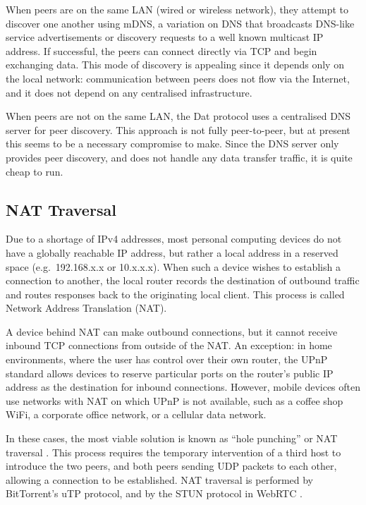 \documentclass[sigplan,10pt]{acmart}
\begin{document}
When peers are on the same LAN (wired or wireless network), they attempt to discover one another using mDNS, a variation on DNS that broadcasts DNS-like service advertisements or discovery requests to a well known multicast IP address.
If successful, the peers can connect directly via TCP and begin exchanging data.
This mode of discovery is appealing since it depends only on the local network: communication between peers does not flow via the Internet, and it does not depend on any centralised infrastructure.

When peers are not on the same LAN, the Dat protocol uses a centralised DNS server for peer discovery.
This approach is not fully peer-to-peer, but at present this seems to be a necessary compromise to make.
Since the DNS server only provides peer discovery, and does not handle any data transfer traffic, it is quite cheap to run.

\subsection{NAT Traversal}\label{sec:nat-traversal}

Due to a shortage of IPv4 addresses, most personal computing devices do not have a globally reachable IP address, but rather a local address in a reserved space (e.g.\ 192.168.x.x or 10.x.x.x).
When such a device wishes to establish a connection to another, the local router records the destination of outbound traffic and routes responses back to the originating local client.
This process is called Network Address Translation (NAT).

A device behind NAT can make outbound connections, but it cannot receive inbound TCP connections from outside of the NAT.
An exception: in home environments, where the user has control over their own router, the UPnP standard allows devices to reserve particular ports on the router's public IP address as the destination for inbound connections.
However, mobile devices often use networks with NAT on which UPnP is not available, such as a coffee shop WiFi, a corporate office network, or a cellular data network.

In these cases, the most viable solution is known as ``hole punching'' or NAT traversal \cite{RFC5389}.
This process requires the temporary intervention of a third host to introduce the two peers, and both peers sending UDP packets to each other, allowing a connection to be established.
NAT traversal is performed by BitTorrent's uTP protocol, and by the STUN protocol in WebRTC \cite{RFC5389}.
\end{document}
